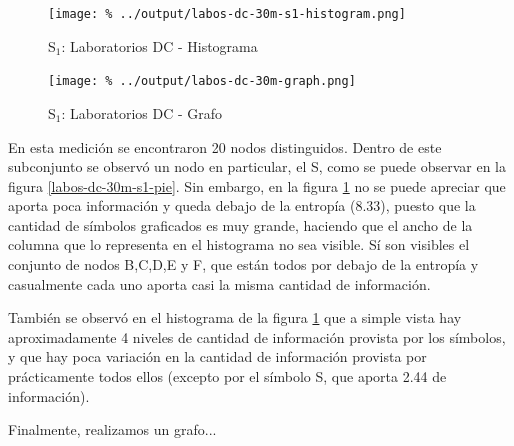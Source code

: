 \documentclass[final,inline,a4paper,narroweqnarray]{ieee}
\begin{document}
    \begin{figure}[H]\begin{center}
      \texttt{[image: \%
      ../output/labos-dc-30m-s1-histogram.png]}
      \caption{S$_1$: Laboratorios DC - Histograma}
      \label{labos-dc-30m-s1-histogram}
    \end{center}\end{figure}
   
    \begin{figure}[H]\begin{center}
      \texttt{[image: \%
      ../output/labos-dc-30m-graph.png]}
      \caption{S$_1$: Laboratorios DC - Grafo}
      \label{labos-dc-30m-graph}
    \end{center}\end{figure}
  
  En esta medición se encontraron 20 nodos distinguidos. Dentro de este 
  subconjunto se observó un nodo en particular, el S, como se puede observar 
  en la figura \ref{labos-dc-30m-s1-pie}. Sin embargo, en la figura 
  \ref{labos-dc-30m-s1-histogram} no se puede apreciar que aporta poca
  información y queda debajo de la entropía (8.33), puesto que la cantidad de
  símbolos graficados es muy grande, haciendo que el ancho de la columna que
  lo representa en el histograma no sea visible. Sí son visibles el conjunto
  de nodos B,C,D,E y F, que están todos por debajo de la entropía y casualmente
  cada uno aporta casi la misma cantidad de información. 

  También se observó en el histograma de la figura
  \ref{labos-dc-30m-s1-histogram} que a simple vista hay aproximadamente 4 niveles 
  de cantidad de información provista por los símbolos, y que hay poca
  variación en la cantidad de información provista por prácticamente todos
  ellos (excepto por el símbolo S, que aporta 2.44 de información).
  
  Finalmente, realizamos un grafo... 

\end{document}
